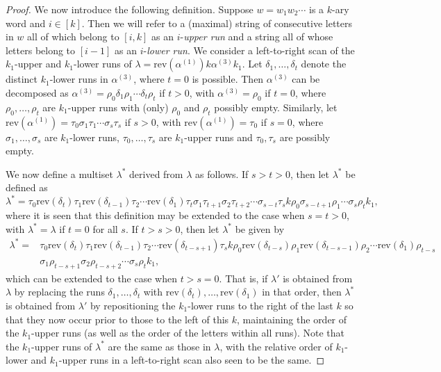\documentclass[11pt]{amsart}
\theoremstyle{plain}
\theoremstyle{definition}
\begin{document}
\begin{proof}
We now introduce the following definition.  Suppose $w=w_1w_2\cdots$ is a $k$-ary word and $i \in
[k]$.  Then we will refer to a (maximal) string of consecutive letters in $w$ all of which belong to
$[i,k]$ as an $i$-\emph{upper run} and a string all of whose letters belong to $[i-1]$ as an
$i$-\emph{lower run}.  We consider a left-to-right scan of the $k_1$-upper and $k_1$-lower runs of
$\lambda=\text{rev}(\alpha^{(1)})k\alpha^{(3)}k_1$.  Let $\delta_1,\ldots,\delta_t$ denote the
distinct $k_1$-lower runs in $\alpha^{(3)}$, where $t=0$ is possible. Then $\alpha^{(3)}$ can be decomposed as
$\alpha^{(3)}=\rho_0\delta_1\rho_1\cdots\delta_t\rho_t$ if $t>0$, with $\alpha^{(3)}=\rho_0$ if $t=0$, where $\rho_0,\ldots,\rho_t$ are $k_1$-upper runs with (only) $\rho_0$ and $\rho_t$ possibly empty.  Similarly, let $\text{rev}(\alpha^{(1)})=\tau_0\sigma_1\tau_1\cdots\sigma_s\tau_s$ if $s>0$, with $\text{rev}(\alpha^{(1)})=\tau_0$ if $s=0$, where $\sigma_1,\ldots,\sigma_s$ are $k_1$-lower runs, $\tau_0,\ldots,\tau_s$ are $k_1$-upper runs and $\tau_0,\tau_s$ are possibly empty.

We now define a multiset $\lambda^*$ derived from $\lambda$ as follows.  If $s>t>0$, then let $\lambda^*$ be defined as
$$\lambda^*=\tau_0\text{rev}(\delta_t)\tau_1\text{rev}(\delta_{t-1})\tau_2\cdots\text{rev}(\delta_1)\tau_t\sigma_1\tau_{t+1}\sigma_2\tau_{t+2}\cdots \sigma_{s-t}\tau_s k \rho_0\sigma_{s-t+1}\rho_1\cdots \sigma_s\rho_tk_1,$$
where it is seen that this definition may be extended to the case when $s=t>0$, with $\lambda^*=\lambda$ if $t=0$ for all $s$.  If $t>s>0$, then let $\lambda^*$ be given by
\begin{align*}
\lambda^*=&\tau_0\text{rev}(\delta_t)\tau_1\text{rev}(\delta_{t-1})\tau_2\cdots\text{rev}(\delta_{t-s+1})\tau_sk\rho_0\text{rev}(\delta_{t-s})\rho_1\text{rev}(\delta_{t-s-1})\rho_2\cdots
\text{rev}(\delta_1)\rho_{t-s}\\
&\sigma_1\rho_{t-s+1}\sigma_2\rho_{t-s+2}\cdots\sigma_s\rho_tk_1,
\end{align*}
which can be extended to the case when $t>s=0$.  That is, if $\lambda'$ is obtained from
$\lambda$ by replacing the runs $\delta_1,\ldots,\delta_t$ with
$\text{rev}(\delta_t),\ldots,\text{rev}(\delta_1)$ in that order, then $\lambda^*$ is obtained
from $\lambda'$ by repositioning the $k_1$-lower runs to the right of the last $k$ so that they now
occur prior to those to the left of this $k$, maintaining the order of the $k_1$-upper runs (as well
as the order of the letters within all runs).   Note that the $k_1$-upper runs of $\lambda^*$ are the same as those in $\lambda$, with the relative order of $k_1$-lower and $k_1$-upper runs in a left-to-right scan also seen to be the same.


\end{proof}
\end{document}
